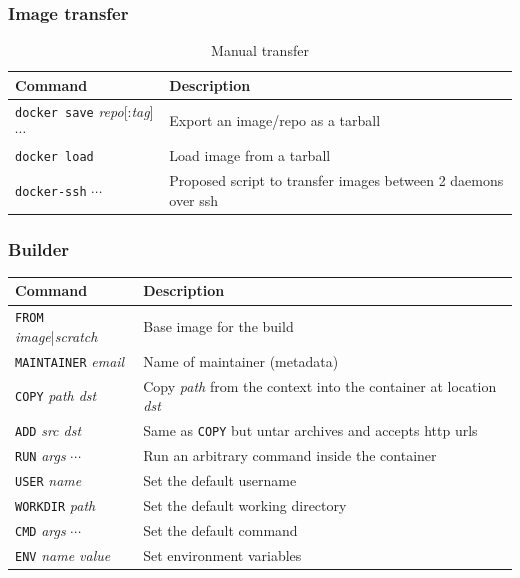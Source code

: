 \documentclass[aspectratio=169]{beamer}
\begin{document}
\begin{frame}
\frametitle{Image transfer}
	\begin{table}[hbp]
		\center
		\begin{tabular}{lp{21em}}
			\toprule
			\textbf{Command} & \textbf{Description} \\
			\midrule
			\texttt{docker save} \textit{repo}[:\textit{tag}] $\cdots$
				& Export an image/repo as a tarball \\
			\texttt{docker load} & Load image from a tarball \\
			\midrule
			\texttt{docker-ssh} $\cdots$ & Proposed script to transfer images between 2 daemons over ssh \\
			\bottomrule
		\end{tabular}
		\caption{Manual transfer}
	\end{table}
\end{frame}

\begin{frame}
\frametitle{Builder}
	\begin{table}[hbp]
		\center
		\begin{tabular}{lp{21em}}
			\toprule
			\textbf{Command} & \textbf{Description} \\
			\midrule
			\texttt{FROM} \textit{image}|\textit{scratch}
				& Base image for the build \\
			\texttt{MAINTAINER} \textit{email}
				& Name of maintainer (metadata) \\
			\midrule
			\texttt{COPY} \textit{path dst}
				& Copy \textit{path} from the context into the container at location \textit{dst} \\
			\texttt{ADD} \textit{src dst}
				& Same as \texttt{COPY} but untar archives and accepts http urls \\
			\texttt{RUN} \textit{args} $\cdots$
				& Run an arbitrary command inside the container \\
			\midrule
			\texttt{USER} \textit{name}
				& Set the default username \\
			\texttt{WORKDIR} \textit{path}
				& Set the default working directory \\
			\texttt{CMD} \textit{args} $\cdots$
				& Set the default command \\
			\texttt{ENV} \textit{name value}
				& Set environment variables \\
			\bottomrule
		\end{tabular}
	\end{table}
\end{frame}
\end{document}
